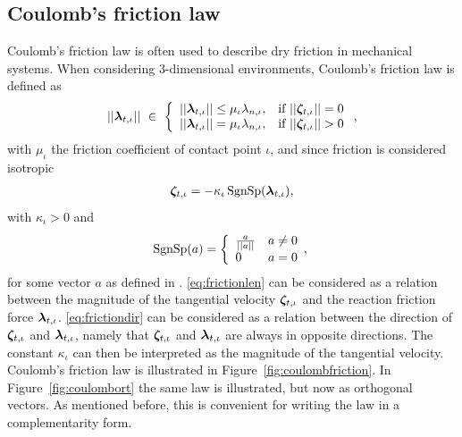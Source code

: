\documentclass[../DC2017114Bouma.tex]{subfiles}
\begin{document}
\subsection{Coulomb's friction law}
Coulomb's friction law is often used to describe dry friction in mechanical systems. When considering 3-dimensional environments, Coulomb's friction law is defined as 
\begin{align}
||\lambdab_{t,\iota}||\ \in\ \left\{ \begin{array}{ll}
||\lambdab_{t,\iota}||\leq\mu_{\iota}\lambda_{n,\iota}, &\text{if }||\zetab_{t,\iota}||=0\\
||\lambdab_{t,\iota}|| = \mu_{\iota}\lambda_{n,\iota}, &\text{if }||\zetab_{t,\iota}||>0
\end{array}\right.,\label{eq:frictionlen}
\end{align}
%
with $\mu_{\iota}$ the friction coefficient of contact point $\iota$, and since friction is considered isotropic
\begin{align}
\boldsymbol{\zeta}_{t,\iota} = -\kappa_{\iota}\operatorname{\text{SgnSp}}(\boldsymbol{\lambda}_{t,\iota}),\label{eq:frictiondir}
\end{align}
with $\kappa_{\iota}>0$ and
\begin{equation}
\operatorname{\text{SgnSp}}(a) = \left\lbrace\begin{array}{ll}
\frac{a}{||a||} & a \neq 0\\
0 & a = 0
\end{array},\right.
\end{equation}
for some vector $a$ as defined in \cite{Studer2006}. \eqref{eq:frictionlen} can be considered as a relation between the magnitude of the tangential velocity $\boldsymbol{\zeta}_{t,\iota}$ and the reaction friction force $\boldsymbol{\lambda}_{t,\iota}$. \eqref{eq:frictiondir} can be considered as a relation between the direction of $\boldsymbol{\zeta}_{t,\iota}$ and $\boldsymbol{\lambda}_{t,\iota}$, namely that $\boldsymbol{\zeta}_{t,\iota}$ and $\boldsymbol{\lambda}_{t,\iota}$ are always in opposite directions. The constant $\kappa_{\iota}$ can then be interpreted as the magnitude of the tangential velocity. Coulomb's friction law is illustrated in Figure~\ref{fig:coulombfriction}. In Figure~\ref{fig:coulombort} the same law is illustrated, but now as orthogonal vectors. As mentioned before, this is convenient for writing the law in a complementarity form.
\end{document}
